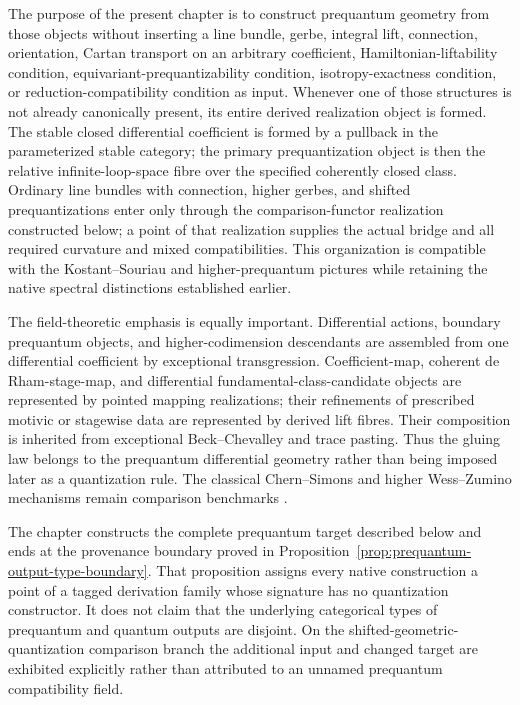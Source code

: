 The purpose of the present chapter is to construct prequantum geometry from those
objects without inserting a line bundle, gerbe, integral lift, connection,
orientation, Cartan transport on an arbitrary coefficient, Hamiltonian-liftability
condition, equivariant-prequantizability condition, isotropy-exactness condition,
or reduction-compatibility condition as input.  Whenever one of those structures
is not already canonically present, its entire derived realization object is
formed.  The stable closed differential coefficient is formed by a pullback in
the parameterized stable category; the primary prequantization object is then the
relative infinite-loop-space fibre over the specified coherently closed class.
Ordinary
line bundles with connection, higher gerbes, and shifted prequantizations enter
only through the comparison-functor realization constructed below; a point of
that realization supplies the actual bridge and all required curvature and mixed
compatibilities.  This organization is compatible with the
Kostant--Souriau and higher-prequantum pictures
\cite{Kostant1970,FiorenzaRogersSchreiber2013,Schreiber2016} while retaining the
native spectral distinctions established earlier.

The field-theoretic emphasis is equally important.  Differential actions,
boundary prequantum objects, and higher-codimension descendants are assembled from
one differential coefficient by exceptional transgression.  Coefficient-map,
coherent de Rham-stage-map, and differential fundamental-class-candidate objects
are represented by pointed mapping realizations; their refinements of prescribed
motivic or stagewise data are represented by derived lift fibres.  Their
composition is inherited from
exceptional Beck--Chevalley and trace pasting.  Thus the gluing law belongs to the
prequantum differential geometry rather than being imposed later as a
quantization rule.  The classical Chern--Simons and higher Wess--Zumino mechanisms
remain comparison benchmarks \cite{Freed1995,FiorenzaSatiSchreiber2013}.

The chapter constructs the complete prequantum target described below and ends
at the provenance boundary proved in
Proposition~\ref{prop:prequantum-output-type-boundary}.  That proposition assigns
every native construction a point of a tagged derivation family whose signature has no
quantization constructor.  It does not claim that the underlying categorical
types of prequantum and quantum outputs are disjoint.  On the
shifted-geometric-quantization comparison branch the additional input and changed
target are exhibited explicitly rather than attributed to an unnamed prequantum
compatibility field.

